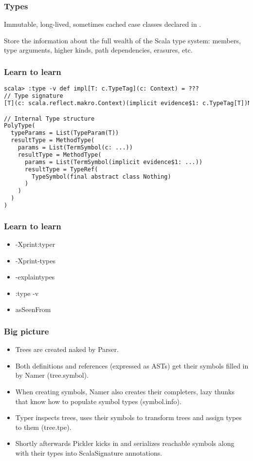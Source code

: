 \documentclass[hyperref={bookmarks=false}]{beamer}
\begin{document}
\begin{frame}[fragile]
\frametitle{Types}

Immutable, long-lived, sometimes cached case classes declared in .

Store the information about the full wealth of the Scala type system:
members, type arguments, higher kinds, path dependencies, erasures, etc.

\end{frame}

\begin{frame}[fragile]
\frametitle{Learn to learn}

\begin{lstlisting}[language=XML]
scala> :type -v def impl[T: c.TypeTag](c: Context) = ???
// Type signature
[T](c: scala.reflect.makro.Context)(implicit evidence$1: c.TypeTag[T])Nothing

// Internal Type structure
PolyType(
  typeParams = List(TypeParam(T))
  resultType = MethodType(
    params = List(TermSymbol(c: ...))
    resultType = MethodType(
      params = List(TermSymbol(implicit evidence$1: ...))
      resultType = TypeRef(
        TypeSymbol(final abstract class Nothing)
      )
    )
  )
)
\end{lstlisting}
\end{frame}

\begin{frame}[fragile]
\frametitle{Learn to learn}

\begin{itemize}
\item -Xprint:typer
\item -Xprint-types
\item -explaintypes
\item :type -v
\item asSeenFrom
\end{itemize}

\end{frame}

\begin{frame}[fragile]
\frametitle{Big picture}

\begin{itemize}
\item Trees are created naked by Parser.
\item Both definitions and references (expressed as ASTs) get their symbols filled in by Namer (tree.symbol).
\item When creating symbols, Namer also creates their completers, lazy thunks that know how to populate symbol types (symbol.info).
\item Typer inspects trees, uses their symbols to transform trees and assign types to them (tree.tpe).
\item Shortly afterwards Pickler kicks in and serializes reachable symbols along with their types into ScalaSignature annotations.
\end{itemize}
\end{frame}
\end{document}
